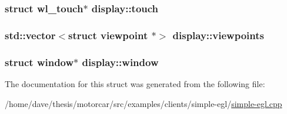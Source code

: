 \hypertarget{structdisplay_a8adde40dc3f12d1a6967cf424e2284df}{
\subsubsection[{touch}]{\setlength{\rightskip}{0pt plus 5cm}struct wl\-\_\-touch$\ast$ display\-::touch}}\label{structdisplay_a8adde40dc3f12d1a6967cf424e2284df}
\hypertarget{structdisplay_ab06917115c7908ddb72c42162d234b72}{
\subsubsection[{viewpoints}]{\setlength{\rightskip}{0pt plus 5cm}std\-::vector$<$struct {\bf viewpoint} $\ast$$>$ display\-::viewpoints}}\label{structdisplay_ab06917115c7908ddb72c42162d234b72}
\hypertarget{structdisplay_a9974d560bec291487ae2440f897ffc58}{
\subsubsection[{window}]{\setlength{\rightskip}{0pt plus 5cm}struct {\bf window}$\ast$ display\-::window}}\label{structdisplay_a9974d560bec291487ae2440f897ffc58}


The documentation for this struct was generated from the following file\-:\begin{DoxyCompactItemize}
\item 
/home/dave/thesis/motorcar/src/examples/clients/simple-\/egl/\hyperlink{simple-egl_8cpp}{simple-\/egl.\-cpp}\end{DoxyCompactItemize}
